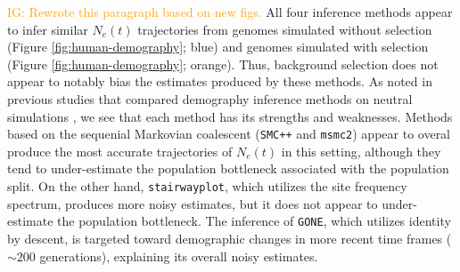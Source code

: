 \documentclass[hidelinks]{article}
\newcommand{\msmc}{\texttt{msmc2}\xspace}
\newcommand{\stairway}{\texttt{stairwayplot}\xspace}
\newcommand{\gone}{\texttt{GONE}\xspace}
\newcommand{\smcpp}{\texttt{SMC++}\xspace}
\newcommand{\igcomment}[1]{\textcolor{orange}{IG: #1}}
\begin{document}
    \igcomment{Rewrote this paragraph based on new figs.}
    All four inference methods appear to infer similar $N_e(t)$ trajectories from
    genomes simulated without selection (Figure \ref{fig:human-demography}; blue) and
    genomes simulated with selection (Figure \ref{fig:human-demography}; orange).
    Thus, background selection does not appear to notably bias the estimates
    produced by these methods.
    As noted in previous studies that compared demography inference methods
    on neutral simulations \citep{adrion2020community},
    we see that each method has its strengths and weaknesses.
    Methods based on the sequenial Markovian coalescent (\smcpp and \msmc)
    appear to overal produce the most accurate trajectories of $N_e(t)$
    in this setting, although they tend to under-estimate the population
    bottleneck associated with the population split.
    On the other hand, \stairway, which utilizes the site frequency spectrum,
    produces more noisy estimates,
    but it does not appear to under-estimate the population bottleneck.
    The inference of \gone, which utilizes identity by descent,
    is targeted toward demographic changes in more recent time frames ($\sim 200$ generations),
    explaining its overall noisy estimates.
    
    


\end{document}
